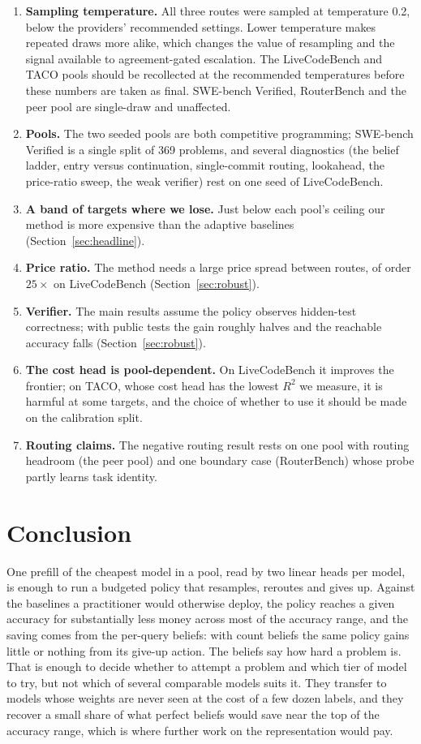 \documentclass[10pt]{article} %
\begin{document}
\begin{enumerate}
\item \textbf{Sampling temperature.}  All three routes were sampled at temperature 0.2, below
the providers' recommended settings.  Lower temperature makes repeated draws more alike, which
changes the value of resampling and the signal available to agreement-gated escalation.  The
LiveCodeBench and TACO pools should be recollected at the recommended temperatures before these
numbers are taken as final.  SWE-bench Verified, RouterBench and the peer pool are single-draw
and unaffected.
\item \textbf{Pools.}  The two seeded pools are both competitive programming; SWE-bench Verified
is a single split of 369 problems, and several diagnostics (the belief ladder, entry versus
continuation, single-commit routing, lookahead, the price-ratio sweep, the weak verifier) rest
on one seed of LiveCodeBench.
\item \textbf{A band of targets where we lose.}  Just below each pool's ceiling our method is
more expensive than the adaptive baselines (Section~\ref{sec:headline}).
\item \textbf{Price ratio.}  The method needs a large price spread between routes, of order
$25\times$ on LiveCodeBench (Section~\ref{sec:robust}).
\item \textbf{Verifier.}  The main results assume the policy observes hidden-test correctness;
with public tests the gain roughly halves and the reachable accuracy falls
(Section~\ref{sec:robust}).
\item \textbf{The cost head is pool-dependent.}  On LiveCodeBench it improves the frontier; on
TACO, whose cost head has the lowest $R^2$ we measure, it is harmful at some targets, and the
choice of whether to use it should be made on the calibration split.
\item \textbf{Routing claims.}  The negative routing result rests on one pool with routing
headroom (the peer pool) and one boundary case (RouterBench) whose probe partly learns task
identity.
\end{enumerate}

\section{Conclusion}
\label{sec:conclusion}

One prefill of the cheapest model in a pool, read by two linear heads per model, is enough to run
a budgeted policy that resamples, reroutes and gives up.  Against the baselines a practitioner
would otherwise deploy, the policy reaches a given accuracy for substantially less money across
most of the accuracy range, and the saving comes from the per-query beliefs: with count beliefs
the same policy gains little or nothing from its give-up action.  The beliefs say how hard a
problem is.  That is enough to decide whether to attempt a problem and which tier of model to
try, but not which of several comparable models suits it.  They
transfer to models whose weights are never seen at the cost of a few dozen labels, and they
recover a small share of what perfect beliefs would save near the top of the accuracy range,
which is where further work on the representation would pay.
\end{document}
